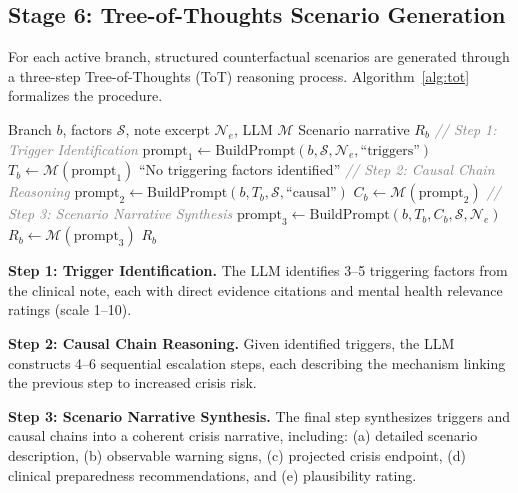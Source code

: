 \documentclass[conference]{IEEEtran}
\begin{document}
\subsection{Stage 6: Tree-of-Thoughts Scenario Generation}

For each active branch, structured counterfactual scenarios are generated through a three-step Tree-of-Thoughts (ToT) reasoning process. Algorithm~\ref{alg:tot} formalizes the procedure.

\begin{algorithm}[h]
\caption{Tree-of-Thoughts Scenario Generation}
\label{alg:tot}
\begin{algorithmic}[1]
\REQUIRE Branch $b$, factors $\mathcal{S}$, note excerpt $\mathcal{N}_e$, LLM $\mathcal{M}$
\ENSURE Scenario narrative $R_b$
\STATE \textcolor{gray}{\textit{// Step 1: Trigger Identification}}
\STATE $\text{prompt}_1 \leftarrow \text{BuildPrompt}(b, \mathcal{S}, \mathcal{N}_e, \text{``triggers''})$
\STATE $T_b \leftarrow \mathcal{M}(\text{prompt}_1)$ 
    \RETURN ``No triggering factors identified''
\ENDIF
\STATE \textcolor{gray}{\textit{// Step 2: Causal Chain Reasoning}}
\STATE $\text{prompt}_2 \leftarrow \text{BuildPrompt}(b, T_b, \mathcal{S}, \text{``causal''})$
\STATE $C_b \leftarrow \mathcal{M}(\text{prompt}_2)$ 
\STATE \textcolor{gray}{\textit{// Step 3: Scenario Narrative Synthesis}}
\STATE $\text{prompt}_3 \leftarrow \text{BuildPrompt}(b, T_b, C_b, \mathcal{S}, \mathcal{N}_e)$
\STATE $R_b \leftarrow \mathcal{M}(\text{prompt}_3)$
\RETURN $R_b$
\end{algorithmic}
\end{algorithm}

\textbf{Step 1: Trigger Identification.} The LLM identifies 3--5 triggering factors from the clinical note, each with direct evidence citations and mental health relevance ratings (scale 1--10).

\textbf{Step 2: Causal Chain Reasoning.} Given identified triggers, the LLM constructs 4--6 sequential escalation steps, each describing the mechanism linking the previous step to increased crisis risk.

\textbf{Step 3: Scenario Narrative Synthesis.} The final step synthesizes triggers and causal chains into a coherent crisis narrative, including: (a) detailed scenario description, (b) observable warning signs, (c) projected crisis endpoint, (d) clinical preparedness recommendations, and (e) plausibility rating.
\end{document}
